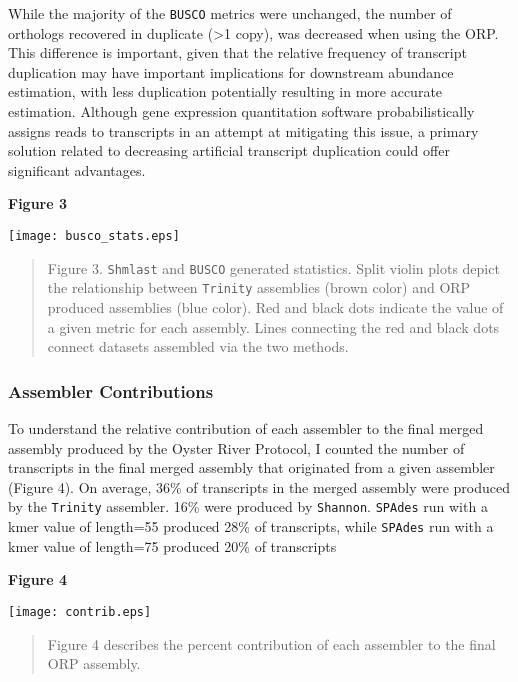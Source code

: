 \documentclass[10pt,letterpaper]{article}
\begin{document}
While the majority of the \texttt{BUSCO} metrics were unchanged, the number of orthologs recovered in duplicate (\textgreater 1 copy), was decreased when using the ORP. This difference is important, given that the relative frequency of transcript duplication may have important implications for downstream abundance estimation, with less  duplication potentially resulting in more accurate estimation. Although gene expression quantitation software \citep{Patro:2017iv,Bray:2016ee} probabilistically assigns reads to transcripts in an attempt at mitigating this issue, a primary solution related to decreasing artificial transcript duplication could offer significant advantages.

\newpage
\textbf{\hypertarget{Figure 3}{Figure 3}} \\
\centerline{\texttt{[image: busco\_stats.eps]}}
\begin{quote}
\small{Figure 3. \texttt{Shmlast} and \texttt{BUSCO} generated statistics. Split violin plots depict the relationship between \texttt{Trinity} assemblies (brown color) and ORP produced assemblies (blue color). Red and black dots indicate the value of a given metric for each assembly. Lines connecting the red and black dots connect datasets assembled via the two methods.}
\end{quote} 

\subsubsection{Assembler Contributions}

To understand the relative contribution of each assembler to the final merged assembly produced by the Oyster River Protocol, I counted the number of transcripts in the final merged assembly that originated from a given assembler (Figure 4). On average, 36\% of transcripts in the merged assembly were produced by the \texttt{Trinity} assembler. 16\% were produced by \texttt{Shannon}. \texttt{SPAdes} run with a kmer value of length=55 produced 28\% of transcripts, while \texttt{SPAdes} run with a kmer value of length=75 produced 20\% of transcripts 

\newpage
\textbf{\hypertarget{Figure 4}{Figure 4}} \\
\centerline{\texttt{[image: contrib.eps]}}
\begin{quote}
\small{Figure 4 describes the percent contribution of each assembler to the final ORP assembly.}
\end{quote} 
\end{document}
